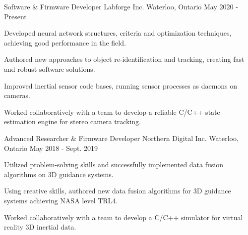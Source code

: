 
\begin{cventries}

  \cventry
    {Software \& Firmware Developer} %
    {Labforge Inc.} %
    {Waterloo, Ontario} %
    {May 2020 - Present} %
    {
      \begin{cvitems} %
        \item {Developed neural network structures, criteria and optimization techniques, achieving good performance in the field.}
        \item {Authored new approaches to object re-identification and tracking, creating fast and robust software solutions.}
        \item {Improved inertial sensor code bases, running sensor processes as daemons on cameras.}
        \item {Worked collaboratively with a team to develop a reliable C/C++ state estimation engine for stereo camera tracking.}
      \end{cvitems}
    }

  \cventry
    {Advanced Researcher \& Firmware Developer} %
    {Northern Digital Inc.} %
    {Waterloo, Ontario} %
    {May 2018 - Sept. 2019} %
    {
      \begin{cvitems} %
        \item {Utilized problem-solving skills and successfully implemented data fusion algorithms on 3D guidance systems.}
        \item {Using creative skills, authored new data fusion algorithms for 3D guidance systems achieving NASA level TRL4.}
        \item {Worked collaboratively with a team to develop a C/C++ simulator for virtual reality 3D inertial data.}
      \end{cvitems}
    }


\end{cventries}
